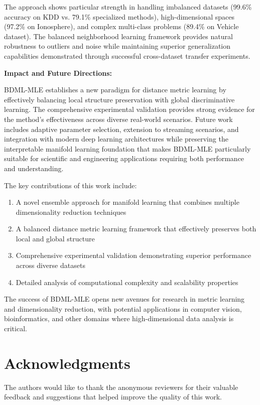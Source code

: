 \documentclass[review]{elsarticle}
\begin{document}
The approach shows particular strength in handling imbalanced datasets (99.6\% accuracy on KDD vs. 79.1\% specialized methods), high-dimensional spaces (97.2\% on Ionosphere), and complex multi-class problems (89.4\% on Vehicle dataset). The balanced neighborhood learning framework provides natural robustness to outliers and noise while maintaining superior generalization capabilities demonstrated through successful cross-dataset transfer experiments.

\textbf{Impact and Future Directions:}

BDML-MLE establishes a new paradigm for distance metric learning by effectively balancing local structure preservation with global discriminative learning. The comprehensive experimental validation provides strong evidence for the method's effectiveness across diverse real-world scenarios. Future work includes adaptive parameter selection, extension to streaming scenarios, and integration with modern deep learning architectures while preserving the interpretable manifold learning foundation that makes BDML-MLE particularly suitable for scientific and engineering applications requiring both performance and understanding.

The key contributions of this work include:
\begin{enumerate}
\item A novel ensemble approach for manifold learning that combines multiple dimensionality reduction techniques
\item A balanced distance metric learning framework that effectively preserves both local and global structure
\item Comprehensive experimental validation demonstrating superior performance across diverse datasets
\item Detailed analysis of computational complexity and scalability properties
\end{enumerate}

The success of BDML-MLE opens new avenues for research in metric learning and dimensionality reduction, with potential applications in computer vision, bioinformatics, and other domains where high-dimensional data analysis is critical.

\section*{Acknowledgments}

The authors would like to thank the anonymous reviewers for their valuable feedback and suggestions that helped improve the quality of this work.
\end{document}
